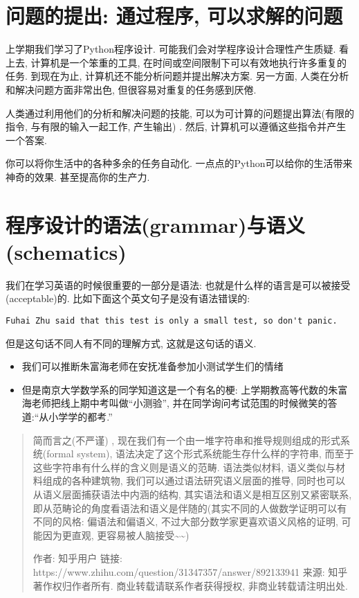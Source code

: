 \section{问题的提出: 通过程序, 可以求解的问题}

上学期我们学习了Python程序设计. 可能我们会对学程序设计合理性产生质疑. 
看上去, 计算机是一个笨重的工具, 在时间或空间限制下可以有效地执行许多重复的任务. 到现在为止, 计算机还不能分析问题并提出解决方案. 另一方面,
人类在分析和解决问题方面非常出色, 但很容易对重复的任务感到厌倦. 

人类通过利用他们的分析和解决问题的技能, 可以为可计算的问题提出算法(有限的指令, 与有限的输入一起工作, 产生输出) . 然后,
计算机可以遵循这些指令并产生一个答案. 

你可以将你生活中的各种多余的任务自动化. 一点点的Python可以给你的生活带来神奇的效果. 甚至提高你的生产力. 

\section{程序设计的语法(grammar)与语义(schematics)}

我们在学习英语的时候很重要的一部分是语法: 也就是什么样的语言是可以被接受(acceptable)的. 比如下面这个英文句子是没有语法错误的: 
\begin{verbatim}
Fuhai Zhu said that this test is only a small test, so don't panic.
\end{verbatim}
但是这句话不同人有不同的理解方式, 这就是这句话的语义. 
\begin{itemize}
\item 我们可以推断朱富海老师在安抚准备参加小测试学生们的情绪
\item 但是南京大学数学系的同学知道这是一个有名的梗: 上学期教高等代数的朱富海老师把线上期中考叫做``小测验'', 并在同学询问考试范围的时候微笑的答道:``从小学学的都考.''
\end{itemize}
\begin{quote}
简而言之(不严谨) , 现在我们有一个由一堆字符串和推导规则组成的形式系统(formal system), 语法决定了这个形式系统能生存什么样的字符串, 而至于这些字符串有什么样的含义则是语义的范畴.
语法类似材料, 语义类似与材料组成的各种建筑物, 我们可以通过语法研究语义层面的推导, 同时也可以从语义层面捕获语法中内涵的结构,
其实语法和语义是相互区别又紧密联系, 即从范畴论的角度看语法和语义是伴随的(其实不同的人做数学证明可以有不同的风格: 偏语法和偏语义,
不过大部分数学家更喜欢语义风格的证明, 可能因为更直观, 更容易被人脑接受\textasciitilde\textasciitilde ) 

作者: 知乎用户 链接: https://www.zhihu.com/question/31347357/answer/892133941
来源: 知乎 著作权归作者所有. 商业转载请联系作者获得授权, 非商业转载请注明出处. 
\end{quote}

